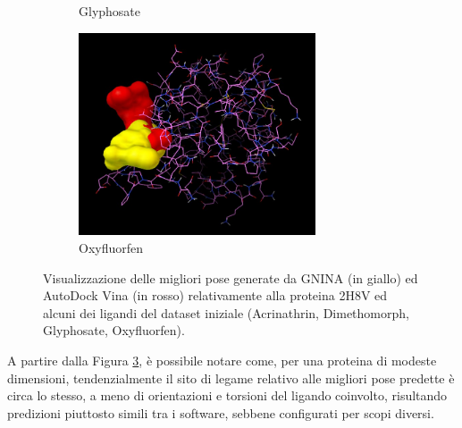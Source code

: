 \begin{figure}[H]
\begin{subfigure}[b]{0.475\textwidth}
        \caption[]%
        {{\small Glyphosate}}    
        \label{fig:2h8v_glyphosate}
    \end{subfigure}
    \hfill
    \begin{subfigure}[b]{0.475\textwidth}   
        \centering 
        \includegraphics[width=\textwidth, height=6cm]{images/chapter4/visualization/2h8v_oxyfluorfen.jpg}
        \caption[]%
        {{\small Oxyfluorfen}}    
        \label{fig:2h8v_oxyfluorfen}
    \end{subfigure}
    \caption[Conformazioni proteina-ligando per la proteina 2H8V]
    {\small Visualizzazione delle migliori pose generate da GNINA (in giallo) ed AutoDock Vina (in rosso) relativamente alla proteina 2H8V ed alcuni dei ligandi del dataset iniziale (Acrinathrin, Dimethomorph, Glyphosate, Oxyfluorfen).} 
    \label{fig:2h8v}
\end{figure}

A partire dalla Figura \ref{fig:2h8v}, è possibile notare come, per una proteina di modeste dimensioni, tendenzialmente il sito di legame relativo alle migliori pose predette è circa lo stesso, a meno di orientazioni e torsioni del ligando coinvolto, risultando predizioni piuttosto simili tra i software, sebbene configurati per scopi diversi.


